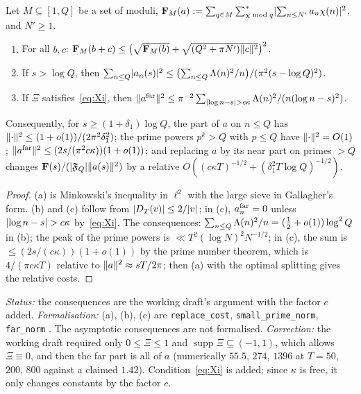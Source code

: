 \begin{lemma}\label{lem:shell-1prime}
Let $M\subseteq[1,Q]$ be a set of moduli, $\mathbf F_M(a):=\sum_{q\in M}\sum^*_{\chi\bmod q}\lvert \sum_{n\le N'}a_n\chi(n)\rvert^2$, and $N'\ge1$.
\begin{enumerate}[label=(\alph*)]
\item For all $b,c$: $\mathbf F_M(b+c)\le\bigl(\sqrt{\mathbf F_M(b)}+\sqrt{(Q^2+\pi N')\lVert c\rVert^2}\bigr)^2$.
\item If $s>\log Q$, then $\sum_{n\le Q}\lvert a_n(s)\rvert^2\le\bigl(\sum_{n\le Q}\Lambda(n)^2/n\bigr)/(\pi^2(s-\log Q)^2)$.
\item If $\Xi$ satisfies~\eqref{eq:Xi}, then $\lVert a^{\rm far}\rVert^2\le\pi^{-2}\sum_{\lvert \log n-s\rvert>c\kappa}\Lambda(n)^2/(n(\log n-s)^2)$.
\end{enumerate}
Consequently, for $s\ge(1+\delta_1)\log Q$, the part of $a$ on $n\le Q$ has $\lVert \cdot\rVert^2\le(1+o(1))/(2\pi^2\delta_1^2)$; the prime powers
$p^k>Q$ with $p\le Q$ have $\lVert \cdot\rVert^2=O(1)$; $\lVert a^{\rm far}\rVert^2\le(2s/(\pi^2c\kappa))(1+o(1))$; and replacing $a$ by its near part on
primes $>Q$ changes $\mathbf F(s)/(\lvert \mathfrak F_Q\rvert\lVert a(s)\rVert^2)$ by a relative $O((c\kappa T)^{-1/2}+(\delta_1^2T\log Q)^{-1/2})$.
\end{lemma}
\begin{proof}
(a) is Minkowski's inequality in $\ell^2$ with the large sieve in Gallagher's form. (b) and (c) follow from $\lvert D_T(v)\rvert\le2/\lvert v\rvert$;
in (c), $a^{\rm far}_n=0$ unless $\lvert \log n-s\rvert>c\kappa$ by~\eqref{eq:Xi}. The consequences: $\sum_{n\le Q}\Lambda(n)^2/n=(\frac12+o(1))\log^2Q$
in (b); the peak of the prime powers is $\ll T^2(\log N)^2N^{-1/2}$; in (c), the sum is $\le(2s/(c\kappa))(1+o(1))$ by the prime number
theorem, which is $4/(\pi c\kappa T)$ relative to $\lVert a\rVert^2\approx sT/2\pi$; then (a) with the optimal splitting gives the relative costs.
\end{proof}
\emph{Status:} the consequences are the working draft's argument with the factor $c$ added. \emph{Formalisation:} (a), (b), (c) are
\texttt{replace\_cost}, \texttt{small\_prime\_norm}, \texttt{far\_norm} \tagL. The asymptotic consequences are not formalised. \emph{Correction:} the working draft required only
$0\le\Xi\le1$ and $\operatorname{supp}\Xi\subseteq(-1,1)$, which allows $\Xi\equiv0$, and then the far part is all of $a$ (numerically $55.5$,
$274$, $1396$ at $T=50$, $200$, $800$ against a claimed $1.42$). Condition~\eqref{eq:Xi} is added; since $\kappa$ is free, it only
changes constants by the factor $c$.

